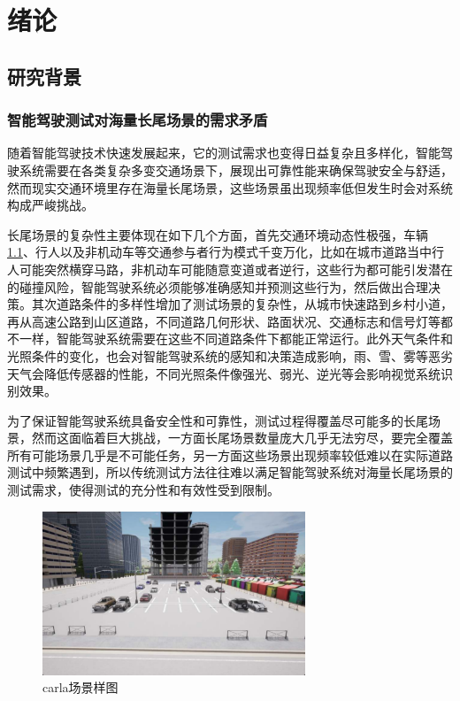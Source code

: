 \chapter{绪论}
\section{研究背景}
\subsection{智能驾驶测试对海量长尾场景的需求矛盾}
随着智能驾驶技术快速发展起来，它的测试需求也变得日益复杂且多样化，智能驾驶系统需要在各类复杂多变交通场景下\cite{abeysirigoonawardena2019adversarial}，展现出可靠性能来确保驾驶安全与舒适，然而现实交通环境里存在海量长尾场景，这些场景虽出现频率低但发生时会对系统构成严峻挑战。

长尾场景的复杂性主要体现在如下几个方面，首先交通环境动态性极强，车辆\ref{fig:vehicle_sample}、行人以及非机动车等交通参与者行为模式千变万化，比如在城市道路当中行人可能突然横穿马路，非机动车可能随意变道或者逆行，\cite{bagschik2018ontology}这些行为都可能引发潜在的碰撞风险，智能驾驶系统必须能够准确感知并预测这些行为，然后做出合理决策。其次道路条件的多样性增加了测试场景的复杂性\cite{biggio2013evasion}，从城市快速路到乡村小道，再从高速公路到山区道路，不同道路几何形状、路面状况、交通标志和信号灯等都不一样，智能驾驶系统需要在这些不同道路条件下都能正常运行\cite{brown2020language}。此外天气条件和光照条件的变化，也会对智能驾驶系统的感知和决策造成影响，雨、雪、雾等恶劣天气会降低传感器的性能，不同光照条件像强光、弱光、逆光等会影响视觉系统识别效果。

为了保证智能驾驶系统具备安全性和可靠性，测试过程得覆盖尽可能多的长尾场景，然而这面临着巨大挑战，一方面长尾场景数量庞大几乎无法穷尽，要完全覆盖所有可能场景几乎是不可能任务，另一方面这些场景出现频率较低难以在实际道路测试中频繁遇到，所以传统测试方法往往难以满足智能驾驶系统对海量长尾场景的测试需求，使得测试的充分性和有效性受到限制\cite{cai2020summit}。
\begin{figure}[h]
	\centering
	\includegraphics[width=0.7\textwidth]{"images/车辆样式图.pdf"}
	\caption{carla场景样图}
	\label{fig:vehicle_sample}
\end{figure}
